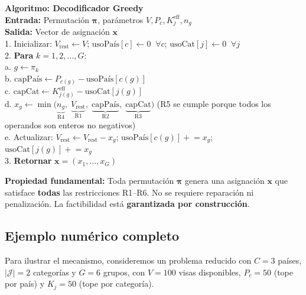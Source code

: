 \documentclass[12pt,letterpaper]{article}
\begin{document}
\begin{notebox}
\textbf{Algoritmo: Decodificador Greedy}\\[4pt]
\textbf{Entrada:} Permutación $\boldsymbol{\pi}$, parámetros $V, P_c, K_j^{\text{eff}}, n_g$\\
\textbf{Salida:} Vector de asignación $\mathbf{x}$\\[6pt]
1. Inicializar: $V_{\text{rest}} \leftarrow V$; \; $\text{usoPaís}[c] \leftarrow 0 \;\; \forall c$; \; $\text{usoCat}[j] \leftarrow 0 \;\; \forall j$\\
2. \textbf{Para} $k = 1, 2, \ldots, G$:\\
\quad a. $g \leftarrow \pi_k$\\
\quad b. $\text{capPaís} \leftarrow P_{c(g)} - \text{usoPaís}[c(g)]$\\
\quad c. $\text{capCat} \leftarrow K_{j(g)}^{\text{eff}} - \text{usoCat}[j(g)]$\\
\quad d. $x_g \leftarrow \min\!\bigl(\underbrace{n_g}_{\text{R4}},\; \underbrace{V_{\text{rest}}}_{\text{R1}},\; \underbrace{\text{capPaís}}_{\text{R2}},\; \underbrace{\text{capCat}}_{\text{R3}}\bigr)$ \hfill {\small (R5 se cumple porque todos los operandos son enteros no negativos)}\\
\quad e. Actualizar: $V_{\text{rest}} \leftarrow V_{\text{rest}} - x_g$; \; $\text{usoPaís}[c(g)] \mathrel{+}= x_g$; \; $\text{usoCat}[j(g)] \mathrel{+}= x_g$\\
3. \textbf{Retornar} $\mathbf{x} = (x_1, \ldots, x_G)$
\end{notebox}

\begin{resultbox}
\textbf{Propiedad fundamental:} Toda permutación $\boldsymbol{\pi}$ genera una asignación $\mathbf{x}$ que satisface \textbf{todas} las restricciones R1--R6. No se requiere reparación ni penalización. La factibilidad está \textbf{garantizada por construcción}.
\end{resultbox}

\subsection{Ejemplo numérico completo}
\label{sec:ejemplo}

Para ilustrar el mecanismo, consideremos un problema reducido con $C = 3$ países, $|\mathcal{J}| = 2$ categorías y $G = 6$ grupos, con $V = 100$ visas disponibles, $P_c = 50$ (tope por país) y $K_j = 50$ (tope por categoría).
\end{document}
